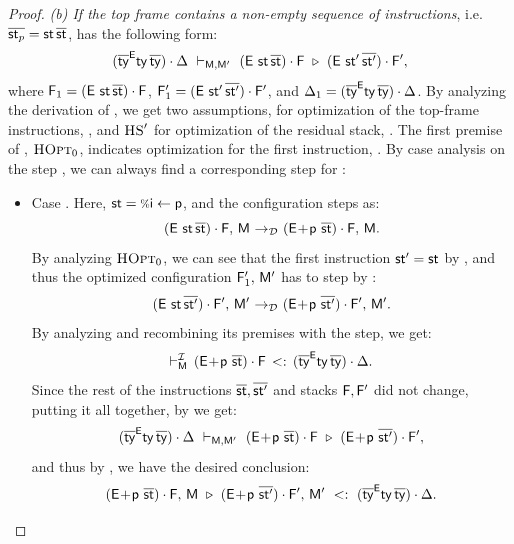 {\begin{proof}
{  \emph{(b) If the top frame contains a non-empty sequence of instructions},
  i.e. $\overline{\mathsf{st}_p} = \mathsf{st}\,\overline{\mathsf{st}}$,
   has the following form:
  \[
    (\overline{\mathsf{ty}}^{\mathsf{E}} \mathsf{ty}\,\overline{\mathsf{ty}}) \cdot \Delta\ \vdash_{\mathsf{M},\mathsf{M}'}\ (\mathsf{E}\ \mathsf{st} \,\overline{\mathsf{st} }) \cdot \mathsf{F} \ \triangleright\ (\mathsf{E}\ \mathsf{st}'\,\overline{\mathsf{st}'}) \cdot \mathsf{F}',
  \]
  where $\mathsf{F}_1 = (\mathsf{E}\ \mathsf{st} \,\overline{\mathsf{st} }) \cdot \mathsf{F} $,
  $\frm'_1 = \stk{(\env\ \st'\,\ol{\st'})}{\frm'}$,
  and $\Delta_1 = (\overline{\mathsf{ty}}^{\mathsf{E}} \mathsf{ty}\,\overline{\mathsf{ty}}) \cdot \Delta$.
  By analyzing the derivation  of ,
  we get two assumptions,  for optimization of the top-frame
  instructions,
  ,
  and $\textsc{HS}'$ for optimization of the residual stack,
  .
  The first premise of , $\textsc{HOpt}_0$, indicates optimization
  for the first instruction, .
  By case analysis on the step
   \stepd {},
  we can always find a corresponding step for :
  \begin{itemize}
    \item Case . Here, $\st = \ass\i\p$,
      and the configuration steps as:
      \[
        (\mathsf{E}\ \mathsf{st}\,\overline{\mathsf{st}}) \cdot \mathsf{F},\, \mathsf{M} ~{\rightarrow_{\mathcal{D}}}~
        (\mathsf{E}\!+\!\mathsf{p}\ \overline{\mathsf{st}}) \cdot \mathsf{F},\, \mathsf{M}.
      \]
      By analyzing $\textsc{HOpt}_0$, we can see that the first instruction
      $\mathsf{st}' = \mathsf{st}$ by , and thus the optimized configuration
      $\mathsf{F}'_1,\, \mathsf{M}'$ has to step by :
      \[
        \config{\stk{(\env\ \st\,\ol{\st'})}{\frm'}}{\mtbl'} \stepd
        \config{\stk{(\env\!+\!\p\ \ol{\st'})}{\frm'}}{\mtbl'}.
      \]
      By analyzing  and recombining its premises with
      the  step, we get:
      \[
        \vdash^{\operatorname{\mathcal{I}}}_{\mathsf{M}}\,(\mathsf{E}\!+\!\mathsf{p}\ \overline{\mathsf{st} }) \cdot \mathsf{F}\,<:\,(\overline{\mathsf{ty}}^{\mathsf{E}} \mathsf{ty}\,\overline{\mathsf{ty}}) \cdot \Delta.
      \]
      Since the rest of the instructions $\overline{\mathsf{st}}, \overline{\mathsf{st}'}$
      and stacks $\mathsf{F}, \mathsf{F}'$ did not change,
      putting it all together, by  we get:
      \[
        (\overline{\mathsf{ty}}^{\mathsf{E}} \mathsf{ty}\,\overline{\mathsf{ty}}) \cdot \Delta\ \vdash_{\mathsf{M},\mathsf{M}'}\ (\mathsf{E}\!+\!\mathsf{p}\ \overline{\mathsf{st} }) \cdot \mathsf{F} \ \triangleright\ (\mathsf{E}\!+\!\mathsf{p}\ \overline{\mathsf{st}'}) \cdot \mathsf{F}',
      \]
      and thus by , we have the desired conclusion:
      \[
        (\mathsf{E}\!+\!\mathsf{p}\ \overline{\mathsf{st}}) \cdot \mathsf{F} ,\, \mathsf{M}\ \triangleright\ (\mathsf{E}\!+\!\mathsf{p}\ \overline{\mathsf{st}'}) \cdot \mathsf{F}',\, \mathsf{M}'\ <:\ (\overline{\mathsf{ty}}^{\mathsf{E}} \mathsf{ty}\,\overline{\mathsf{ty}}) \cdot \Delta.
      \]


\end{itemize}}
\end{proof}}

